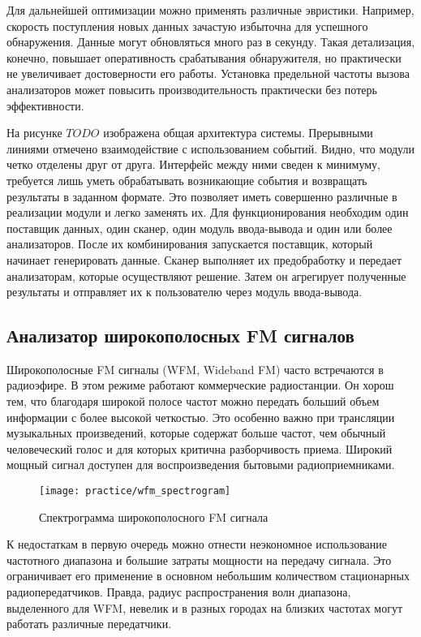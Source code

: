 Для дальнейшей оптимизации можно применять различные эвристики. Например, скорость поступления новых данных зачастую избыточна для успешного обнаружения. Данные могут обновляться много раз в секунду. Такая детализация, конечно, повышает оперативность срабатывания обнаружителя, но практически не увеличивает достоверности его работы. Установка предельной частоты вызова анализаторов может повысить производительность практически без потерь эффективности.

На рисунке $TODO$ изображена общая архитектура системы. Прерывными линиями отмечено взаимодействие с использованием событий. Видно, что модули четко отделены друг от друга. Интерфейс между ними сведен к минимуму, требуется лишь уметь обрабатывать возникающие события и возвращать результаты в заданном формате. Это позволяет иметь совершенно различные в реализации модули и легко заменять их. Для функционирования необходим один поставщик данных, один сканер, один модуль ввода-вывода и один или более анализаторов. После их комбинирования запускается поставщик, который начинает генерировать данные. Сканер выполняет их предобработку и передает анализаторам, которые осуществляют решение. Затем он агрегирует полученные результаты и отправляет их к пользователю через модуль ввода-вывода.


\subsection{Анализатор широкополосных FM сигналов}

Широкополосные FM сигналы (WFM, Wideband FM) часто встречаются в радиоэфире.
В этом режиме работают коммерческие радиостанции.
Он хорош тем, что благодаря широкой полосе частот можно передать больший объем информации с более высокой четкостью. Это особенно важно при трансляции музыкальных произведений, которые содержат больше частот, чем обычный человеческий голос и для которых критична разборчивость приема. Широкий мощный сигнал доступен для воспроизведения бытовыми радиоприемниками.

\begin{figure}[h]
  \centering
  \texttt{[image: practice/wfm\_spectrogram]}
  \caption{Спектрограмма широкополосного FM сигнала}
  \label{fig:practice:wfm_spectrogram}
\end{figure}

К недостаткам в первую очередь можно отнести неэкономное использование частотного диапазона и большие затраты мощности на передачу сигнала. Это ограничивает его применение в основном небольшим количеством стационарных радиопередатчиков. Правда, радиус распространения волн диапазона, выделенного для WFM, невелик и в разных городах на близких частотах могут работать различные передатчики.

